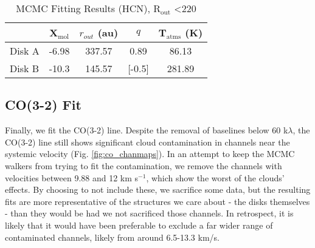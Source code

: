 \begin{table}
  \centering
  \begin{threeparttable}
    \caption{MCMC Fitting Results (HCN), R$_\text{out}$ \textless 220}
    \label{table:fit_hcn}
    \renewcommand{\arraystretch}{1.2}
    \begin{tabular}{l c c c c }
      \toprule \toprule
                & X$_\text{mol}$ & $r_{out}$ (au)     & $q$    & T$_\text{atms}$ (K) \\
      \midrule %
        Disk A  & -6.98          & 337.57             & 0.89   & 86.13 \\
        Disk B  & -10.3          & 145.57             & [-0.5] & 281.89 \\
      \bottomrule
    \end{tabular}
  \end{threeparttable}
\end{table}




\subsection{CO(3-2) Fit}
\label{subsection:co_fit}
Finally, we fit the CO(3-2) line. Despite the removal of baselines below 60 k$\lambda$, the CO(3-2) line still shows significant cloud contamination in channels near the systemic velocity (Fig. \ref{fig:co_chanmaps}). In an attempt to keep the MCMC walkers from trying to fit the contamination, we remove the channels with velocities between 9.88 and 12 km s$^{-1}$, which show the worst of the clouds' effects. By choosing to not include these, we sacrifice some data, but the resulting fits are more representative of the structures we care about - the disks themselves - than they would be had we not sacrificed those channels. In retrospect, it is likely that it would have been preferable to exclude a far wider range of contaminated channels, likely from around 6.5-13.3 km/s.


